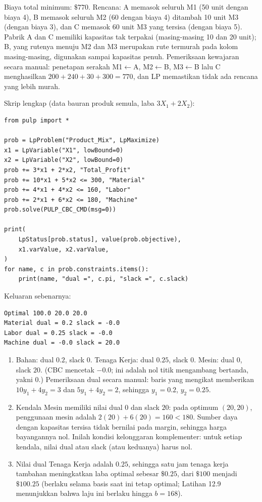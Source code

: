 Biaya total minimum: $\$770$. Rencana: A memasok seluruh M1 (50 unit dengan
biaya 4), B memasok seluruh M2 (60 dengan biaya 4) ditambah 10 unit M3 (dengan
biaya 3), dan C memasok 60 unit M3 yang tersisa (dengan biaya 5). Pabrik A
dan C memiliki kapasitas tak terpakai (masing-masing 10 dan 20 unit); B, yang
rutenya menuju M2 dan M3 merupakan rute termurah pada kolom masing-masing,
digunakan sampai kapasitas penuh. Pemeriksaan kewajaran secara manual:
penetapan serakah M1$\leftarrow$A, M2$\leftarrow$B, M3$\leftarrow$B lalu C
menghasilkan $200 + 240 + 30 + 300 = 770$, dan LP memastikan tidak ada rencana
yang lebih murah.


Skrip lengkap (data bauran produk semula, laba $3X_1 + 2X_2$):

\begin{verbatim}
from pulp import *

prob = LpProblem("Product_Mix", LpMaximize)
x1 = LpVariable("X1", lowBound=0)
x2 = LpVariable("X2", lowBound=0)
prob += 3*x1 + 2*x2, "Total_Profit"
prob += 10*x1 + 5*x2 <= 300, "Material"
prob += 4*x1 + 4*x2 <= 160, "Labor"
prob += 2*x1 + 6*x2 <= 180, "Machine"
prob.solve(PULP_CBC_CMD(msg=0))

print(
    LpStatus[prob.status], value(prob.objective),
    x1.varValue, x2.varValue,
)
for name, c in prob.constraints.items():
    print(name, "dual =", c.pi, "slack =", c.slack)
\end{verbatim}

Keluaran sebenarnya:

\begin{verbatim}
Optimal 100.0 20.0 20.0
Material dual = 0.2 slack = -0.0
Labor dual = 0.25 slack = -0.0
Machine dual = -0.0 slack = 20.0
\end{verbatim}

\begin{enumerate}
\item Bahan: dual $0.2$, slack $0$. Tenaga Kerja: dual $0.25$, slack $0$.
Mesin: dual $0$, slack $20$. (CBC mencetak $-0.0$; ini adalah nol titik
mengambang bertanda, yakni $0$.) Pemeriksaan dual secara manual: baris yang
mengikat memberikan $10y_1 + 4y_2 = 3$ dan $5y_1 + 4y_2 = 2$, sehingga
$y_1 = 0.2$, $y_2 = 0.25$.
\item Kendala Mesin memiliki nilai dual $0$ dan slack $20$: pada optimum
$(20,20)$, penggunaan mesin adalah $2(20) + 6(20) = 160 < 180$. Sumber daya
dengan kapasitas tersisa tidak bernilai pada margin, sehingga harga bayangannya
nol. Inilah kondisi kelonggaran komplementer: untuk setiap kendala, nilai dual atau slack
(atau keduanya) harus nol.
\item Nilai dual Tenaga Kerja adalah $0.25$, sehingga satu jam tenaga kerja
tambahan meningkatkan laba optimal sebesar $\$0.25$, dari $\$100$ menjadi
$\$100.25$ (berlaku selama basis saat ini tetap optimal; Latihan 12.9
menunjukkan bahwa laju ini berlaku hingga $b = 168$).
\end{enumerate}

